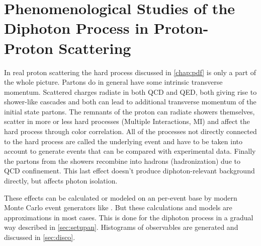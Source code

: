 \chapter{Phenomenological Studies of the Diphoton Process in Proton-Proton
  Scattering}%
\label{chap:pheno}

In real proton scattering the hard process discussed in
\cref{chap:pdf} is only a part of the whole picture. Partons do in
general have some intrinsic transverse momentum.  Scattered charges
radiate in both QCD and QED, both giving rise to shower-like cascades
and both can lead to additional transverse momentum of the initial
state partons. The remnants of the proton can radiate showers
themselves, scatter in more or less hard processes (Multiple
Interactions, MI) and affect the hard process through color
correlation. All of the processes not directly connected to the hard
process are called the underlying event and have to be taken into
account to generate events that can be compared with experimental
data. Finally the partons from the showers recombine into hadrons
(hadronization) due to QCD confinement. This last effect doesn't
produce diphoton-relevant background directly, but affects photon
isolation.~\cite[11]{buckley:2011ge}

These effects can be calculated or modeled on an per-event base by
modern Monte Carlo event generators like \sherpa. But these
calculations and models are approximations in most cases. This is done
for the diphoton process in a gradual way described in
\cref{sec:setupan}. Histograms of observables are generated and
discussed in \cref{sec:disco}.

